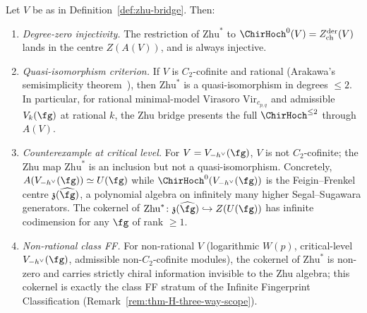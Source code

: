 \begin{proposition}%
\label{prop:zhu-hochschild-comparison}%
%
%
Let $V$ be as in Definition~\ref{def:zhu-bridge}. Then:
\begin{enumerate}
 \item[\textup{(i)}] \emph{Degree-zero injectivity.} The restriction
 of $\mathrm{Zhu}^*$ to $\ChirHoch^0(V)=Z^{\mathrm{der}}_{\mathrm{ch}}(V)$
 lands in the centre $Z(A(V))$, and is always injective.
 \item[\textup{(ii)}] \emph{Quasi-isomorphism criterion.} If $V$ is
 $C_2$-cofinite and rational (Arakawa's semisimplicity
 theorem~\cite{Arakawa15}), then $\mathrm{Zhu}^*$ is a
 quasi-isomorphism in degrees $\le 2$. In particular, for rational
 minimal-model Virasoro $\mathrm{Vir}_{c_{p,q}}$ and admissible
 $V_k(\fg)$ at rational $k$, the Zhu bridge presents the full
 $\ChirHoch^{\le 2}$ through $A(V)$.
 \item[\textup{(iii)}] \emph{Counterexample at critical level.} For
 $V=V_{-h^\vee}(\fg)$, $V$ is not $C_2$-cofinite; the Zhu map
 $\mathrm{Zhu}^*$ is an inclusion but not a quasi-isomorphism.
 Concretely, $A(V_{-h^\vee}(\fg))\simeq U(\fg)$ while
 $\ChirHoch^0(V_{-h^\vee}(\fg))$ is the Feigin--Frenkel centre
 $\mathfrak{z}(\widehat{\fg})$, a polynomial algebra on infinitely
 many higher Segal--Sugawara generators. The cokernel of
 $\mathrm{Zhu}^*\colon \mathfrak{z}(\widehat{\fg})\hookrightarrow Z(U(\fg))$
 has infinite codimension for any $\fg$ of rank $\ge 1$.
 \item[\textup{(iv)}] \emph{Non-rational class FF.} For non-rational
 $V$ (logarithmic $W(p)$, critical-level $V_{-h^\vee}(\fg)$,
 admissible non-$C_2$-cofinite modules), the cokernel of
 $\mathrm{Zhu}^*$ is non-zero and carries strictly chiral information
 invisible to the Zhu algebra; this cokernel is exactly the class FF
 stratum of the Infinite Fingerprint Classification
 (Remark~\ref{rem:thm-H-three-way-scope}).
\end{enumerate}
\end{proposition}


